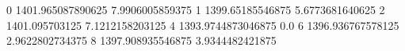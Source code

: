 0 1401.965087890625 7.9906005859375
1 1399.65185546875 5.6773681640625
2 1401.095703125 7.1212158203125
4 1393.9744873046875 0.0
6 1396.936767578125 2.9622802734375
8 1397.908935546875 3.9344482421875
